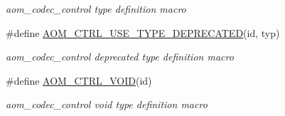 \begin{DoxyCompactItemize}
$$\begin{DoxyCompactList}\small\item\em aom\+\_\+codec\+\_\+control type definition macro \end{DoxyCompactList}\item 
\#define \hyperlink{group__codec_ga9cf4b5ac7ea31c5c1b71816aec572acf}{A\+O\+M\+\_\+\+C\+T\+R\+L\+\_\+\+U\+S\+E\+\_\+\+T\+Y\+P\+E\+\_\+\+D\+E\+P\+R\+E\+C\+A\+T\+ED}(id,  typ)
\begin{DoxyCompactList}\small\item\em aom\+\_\+codec\+\_\+control deprecated type definition macro \end{DoxyCompactList}\item 
\#define \hyperlink{group__codec_ga777f7eab335b851d90e40715efa5396c}{A\+O\+M\+\_\+\+C\+T\+R\+L\+\_\+\+V\+O\+ID}(id)
\begin{DoxyCompactList}\small\item\em aom\+\_\+codec\+\_\+control void type definition macro \end{DoxyCompactList}\end{DoxyCompactItemize}

